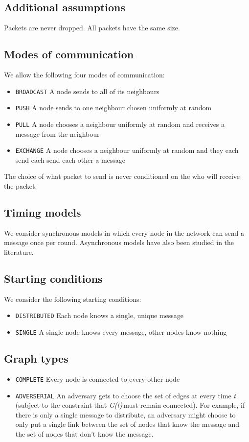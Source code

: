 \documentclass{article} %
\def\graph{\textit{G(t)}\,}
\def\graphtime{\textit{t}\,}
\begin{document}
\subsection{Additional assumptions}
Packets are never dropped. All packets have the same size. 

\subsection{Modes of communication}
We allow the following four modes of communication:
\begin{itemize}
\item \texttt{BROADCAST} A node sends to all of its neighbours
\item \texttt{PUSH} A node sends to one neighbour chosen uniformly at random
\item \texttt{PULL} A node chooses a neighbour uniformly at random and receives a message from the neighbour
\item \texttt{EXCHANGE} A node chooses a neighbour uniformly at random and they each send each send each other a message
\end{itemize}
The choice of what packet to send is never conditioned on the who will receive the packet.

\subsection{Timing models}
We consider synchronous models in which every node in the network can send a message once per round. Asynchronous models have also been studied in the literature.

\subsection{Starting conditions}\label{subsec:startingconditions}
We consider the following starting conditions:
\begin{itemize}
\item \texttt{DISTRIBUTED} Each node knows a single, unique message
\item \texttt{SINGLE} A single node knows every message, other nodes know nothing
\end{itemize}

\subsection{Graph types}
\begin{itemize}
\item \texttt{COMPLETE} Every node is connected to every other node
\item \texttt{ADVERSERIAL} An adversary gets to choose the set of edges at every time \graphtime (subject to the constraint that \graph must remain connected). For example, if there is only a single message to distribute, an adversary might choose to only put a single link between the set of nodes that know the message and the set of nodes that don't know the message. 
\end{itemize}
\end{document}
